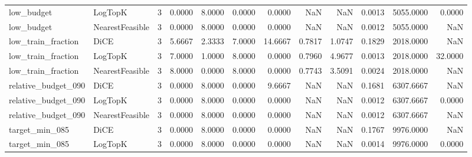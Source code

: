 \begin{tabular}{llrrrrrrrrrr}
          low\_budget &         LogTopK &      3 &            0.0000 &          8.0000 &          0.0000 &        0.0000 &                NaN &            NaN &       0.0013 &          5055.0000 &                0.0000 \\
          low\_budget & NearestFeasible &      3 &            0.0000 &          8.0000 &          0.0000 &        0.0000 &                NaN &            NaN &       0.0012 &          5055.0000 &                   NaN \\
  low\_train\_fraction &            DiCE &      3 &            5.6667 &          2.3333 &          7.0000 &       14.6667 &             0.7817 &         1.0747 &       0.1829 &          2018.0000 &                   NaN \\
  low\_train\_fraction &         LogTopK &      3 &            7.0000 &          1.0000 &          8.0000 &        0.0000 &             0.7960 &         4.9677 &       0.0013 &          2018.0000 &               32.0000 \\
  low\_train\_fraction & NearestFeasible &      3 &            8.0000 &          0.0000 &          8.0000 &        0.0000 &             0.7743 &         3.5091 &       0.0024 &          2018.0000 &                   NaN \\
 relative\_budget\_090 &            DiCE &      3 &            0.0000 &          8.0000 &          0.0000 &        9.6667 &                NaN &            NaN &       0.1681 &          6307.6667 &                   NaN \\
 relative\_budget\_090 &         LogTopK &      3 &            0.0000 &          8.0000 &          0.0000 &        0.0000 &                NaN &            NaN &       0.0012 &          6307.6667 &                0.0000 \\
 relative\_budget\_090 & NearestFeasible &      3 &            0.0000 &          8.0000 &          0.0000 &        0.0000 &                NaN &            NaN &       0.0012 &          6307.6667 &                   NaN \\
      target\_min\_085 &            DiCE &      3 &            0.0000 &          8.0000 &          0.0000 &        0.0000 &                NaN &            NaN &       0.1767 &          9976.0000 &                   NaN \\
      target\_min\_085 &         LogTopK &      3 &            0.0000 &          8.0000 &          0.0000 &        0.0000 &                NaN &            NaN &       0.0014 &          9976.0000 &                0.0000 \\

\end{tabular}
